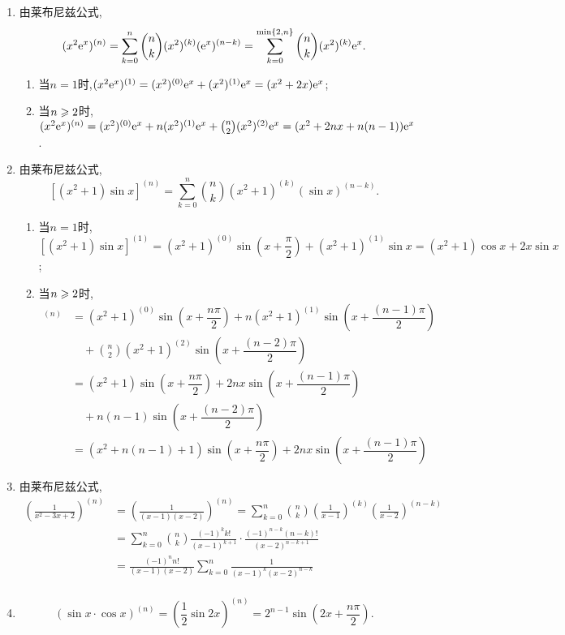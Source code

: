 \begin{solution}
    \begin{enumerate}
        \item 由莱布尼兹公式,$$(x^2 \mathrm{e}^x)^{(n)} = \sum_{k=0}^n \binom{n}{k} (x^2)^{(k)} (\mathrm{e}^x)^{(n-k)} = \sum_{k=0}^{\min\{2,n\}} \binom{n}{k} (x^2)^{(k)} \mathrm{e}^x.$$
              \begin{enumerate}
                  \item 当$n=1$时,$(x^2 \mathrm{e}^x)^{(1)} = (x^2)^{(0)} \mathrm{e}^x + (x^2)^{(1)} \mathrm{e}^x = (x^2 + 2x) \mathrm{e}^x$;
                  \item 当$n \geqslant 2$时,$(x^2 \mathrm{e}^x)^{(n)} = (x^2)^{(0)} \mathrm{e}^x + n (x^2)^{(1)} \mathrm{e}^x + \binom{n}{2} (x^2)^{(2)} \mathrm{e}^x = (x^2 + 2nx + n(n-1)) \mathrm{e}^x$.
              \end{enumerate}
        \item 由莱布尼兹公式,$$[(x^2+1) \sin x]^{(n)} = \sum_{k=0}^n \binom{n}{k} (x^2+1)^{(k)} (\sin x)^{(n-k)} .$$
              \begin{enumerate}
                  \item 当$n=1$时,$[(x^2+1) \sin x]^{(1)} = (x^2+1)^{(0)} \sin(x + \dfrac{\pi}2) + (x^2+1)^{(1)} \sin x = (x^2+1) \cos x + 2x \sin x$;
                  \item 当$n \geqslant 2$时,
                        \begin{align*}
                            [(x^2+1) \sin x]^{(n)} &= (x^2+1)^{(0)} \sin(x + \dfrac{n\pi}2) + n (x^2+1)^{(1)} \sin(x + \dfrac{(n-1)\pi}2) \\
                            & \quad + \binom{n}{2} (x^2+1)^{(2)} \sin(x + \dfrac{(n-2)\pi}2) \\
                            & = (x^2+1) \sin(x + \dfrac{n\pi}2) + 2nx \sin(x + \dfrac{(n-1)\pi}2) \\
                            &\quad + n(n-1) \sin(x + \dfrac{(n-2)\pi}2)\\
                            & = (x^2+n(n-1)+1) \sin(x + \dfrac{n\pi}2) + 2nx \sin(x + \dfrac{(n-1)\pi}2) 
                        \end{align*}
              \end{enumerate}
              \item 由莱布尼兹公式,
              \begin{align*}
                \left( \frac{1}{x^2 - 3x + 2} \right)^{(n)} &= \left( \frac{1}{(x-1)(x-2)} \right)^{(n)} = \sum_{k=0}^n \binom{n}{k} \left( \frac{1}{x-1} \right)^{(k)} \left( \frac{1}{x-2} \right)^{(n-k)} \\
                &= \sum_{k=0}^n \binom{n}{k} \frac{(-1)^k k!}{(x-1)^{k+1}} \cdot \frac{(-1)^{n-k} (n-k)!}{(x-2)^{n-k+1}} \\
                &= \frac{(-1)^n n!}{(x-1)(x-2)} \sum_{k=0}^n \frac{1}{(x-1)^k (x-2)^{n-k}} \\
              \end{align*}
              \item $$(\sin x \cdot \cos x)^{(n)} =\left( \frac12 \sin 2x \right)^{(n)} = 2^{n-1} \sin \left( 2x + \dfrac{n\pi}2 \right).$$
    \end{enumerate}
\end{solution}

